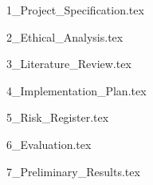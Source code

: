 \documentclass[a4paper, 11pt]{article}
\begin{document}


\tableofcontents

{1_Project_Specification.tex}

{2_Ethical_Analysis.tex}

{3_Literature_Review.tex}

{4_Implementation_Plan.tex}

{5_Risk_Register.tex}

{6_Evaluation.tex}

{7_Preliminary_Results.tex}

\newpage
\printbibliography

\end{document}
